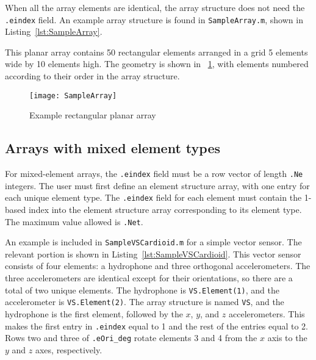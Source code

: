 When all the array elements are identical, the array structure does not need the \texttt{.eindex} field. An example array structure is found in \texttt{SampleArray.m}, shown in Listing~\ref{lst:SampleArray}.



This planar array contains 50 rectangular elements arranged in a grid 5 elements wide by 10 elements high. The geometry is shown in \figname~\ref{fig:SampleArray}, with elements numbered according to their order in the array structure.

\begin{figure}[!ht]
\begin{center}
\texttt{[image: SampleArray]}
\caption{\label{fig:SampleArray}Example rectangular planar array}
\end{center}
\end{figure}

\clearpage
\subsection{Arrays with mixed element types}

For mixed-element arrays, the \texttt{.eindex} field must be a row vector of length \texttt{.Ne} integers. The user must first define an element structure array, with one entry for each unique element type. The \texttt{.eindex} field for each element must contain the 1-based index into the element structure array corresponding to its element type. The maximum value allowed is \texttt{.Net}.

An example is included in \texttt{SampleVSCardioid.m} for a simple vector sensor. The relevant portion is shown in Listing~\ref{lst:SampleVSCardioid}. This vector sensor consists of four elements: a hydrophone and three orthogonal accelerometers. The three accelerometers are identical except for their orientations, so there are a total of two unique elements. The hydrophone is \texttt{VS.Element(1)}, and the accelerometer is \texttt{VS.Element(2)}. The array structure is named \texttt{VS}, and the hydrophone is the first element, followed by the $x$, $y$, and $z$ accelerometers. This makes the first entry in \texttt{.eindex} equal to 1 and the rest of the entries equal to 2. Rows two and three of \texttt{.eOri\_deg} rotate elements 3 and 4 from the $x$ axis to the $y$ and $z$ axes, respectively.


